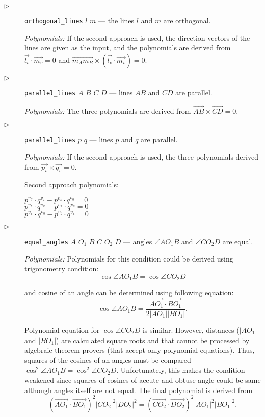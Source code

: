 \documentclass{article}
\begin{document}
\begin{description}
\item[$\triangleright$] {\tt orthogonal\_lines} $l$ $m$ --- the lines
  $l$ and $m$ are orthogonal.

  {\em Polynomials:} If the second approach is used, the direction
  vectors of the lines are given as the input, and the polynomials are
  derived from $\overrightarrow{l_v} \cdot \overrightarrow{m_v} = 0$
  and
  $\overrightarrow{m_Am_B} \times (\overrightarrow{l_v} \cdot
  \overrightarrow{m_v}) = 0$.


\item[$\triangleright$] {\tt parallel\_lines} $A$ $B$ $C$ $D$ ---
  lines $AB$ and $CD$ are parallel.

  {\em Polynomials:} The three polynomials are derived from
  $\overrightarrow{AB} \times \overrightarrow{CD} = 0$.

\item[$\triangleright$] {\tt parallel\_lines} $p$ $q$ --- lines $p$
  and $q$ are parallel.

  {\em Polynomials:} If the second approach is used, the three
  polynomials derived from
  $\overrightarrow{p_v} \times \overrightarrow{q_v} = 0$.

Second approach polynomials:
\begin{tabbing}
$p^{v_y}\cdot q^{v_z} - p^{v_z}\cdot q^{v_y} = 0$ \\
$p^{v_z}\cdot q^{v_x} - p^{v_x}\cdot q^{v_z} = 0$ \\
$p^{v_x}\cdot q^{v_y} - p^{v_y}\cdot q^{v_x} = 0$
\end{tabbing}

\item[$\triangleright$] {\tt equal\_angles} $A$ $O_1$ $B$ $C$ $O_2$ $D$ --- angles $\angle AO_1B$ and $\angle
CO_2D$ are equal.

{\em Polynomials:} Polynomials for this condition could be derived
using trigonometry condition:
$$\cos{\angle AO_1B} = \cos{\angle CO_2D}$$

and cosine of an angle can be determined using following equation:
$$\cos{\angle AO_1B} = \frac{\overrightarrow{AO_1}\cdot
  \overrightarrow{BO_1}}{2|AO_1||BO_1|}.$$

Polynomial equation for $\cos{\angle CO_2D}$ is similar. However,
distances ($|AO_1|$ and $|BO_1|$) are calculated square roots and that
cannot be processed by algebraic theorem provers (that accept only
polynomial equations). Thus, squares of the cosines of an angles must
be compared --- $\cos^2{\angle AO_1B} = \cos^2{\angle CO_2D}$.
Unfortunately, this makes the condition weakened since squares of
cosines of accute and obtuse angle could be same although angles
itself are not equal. The final polynomial is derived from
$$(\overrightarrow{AO_1}\cdot  \overrightarrow{BO_1})^2|CO_2|^2|DO_2|^2 = (\overrightarrow{CO_2}\cdot  \overrightarrow{DO_2})^2|AO_1|^2|BO_1|^2.$$


\end{description}
\end{document}
